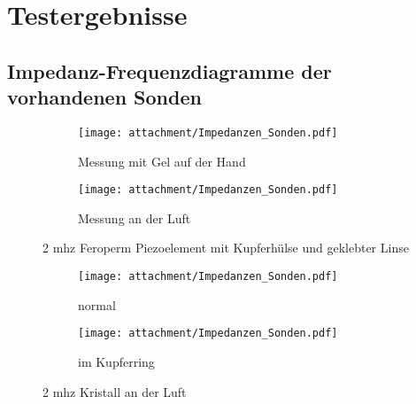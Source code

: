 \chapter{Testergebnisse}
\section{Impedanz-Frequenzdiagramme der vorhandenen Sonden}\label{sec:sonden}
%
\begin{figure}[ht!]
	\centering
	\begin{subfigure}[t!]{0.82\textwidth}
		\centering
  		\texttt{[image: attachment/Impedanzen\_Sonden.pdf]}%
 		\caption{Messung mit Gel auf der Hand}
 		\label{fig:2_sig}
  	\end{subfigure}
  	\begin{subfigure}[t!]{0.82\textwidth}
	  	\centering
  		\texttt{[image: attachment/Impedanzen\_Sonden.pdf]} %
  		\caption{Messung an der Luft}
 		\label{fig:snr_2_script}
  	\end{subfigure}
  	\caption{2 \acs{mhz} Feroperm Piezoelement mit Kupferhülse und geklebter Linse}
\end{figure}
\clearpage

\begin{figure}[ht!]
	\centering
	\begin{subfigure}[t!]{0.82\textwidth}
	  	\centering
  		\texttt{[image: attachment/Impedanzen\_Sonden.pdf]} %
  		\caption{normal}
 		\label{fig:snr_2_script}
  	\end{subfigure}
  	\begin{subfigure}[t!]{0.82\textwidth}
	  	\centering
  		\texttt{[image: attachment/Impedanzen\_Sonden.pdf]} %
  		\caption{im Kupferring}
 		\label{fig:snr_2_script}
  	\end{subfigure}
  	\caption{2 \acs{mhz} Kristall an der Luft}
\end{figure}
\clearpage

